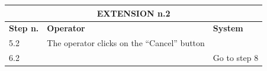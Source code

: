 {{{			\begin{table}[h]
			\begin{tabular}{|p{2cm}|p{6cm}|p{6cm}|}
			\hline
				\multicolumn{3}{|c|}{EXTENSION n.2} \\
			\hline
				\centering \vspace{1mm} \bfseries{Step n.} \vspace{1mm} & \vspace{1mm} \bfseries{Operator} \vspace{1mm} & \vspace{1mm} \bfseries{System} \vspace{1mm}\\
			\hline
				\vspace{1mm} 5.2 \vspace{1mm} &
				\vspace{1mm} The operator clicks on the “Cancel” button\vspace{1mm} & 
				\vspace{1mm} \vspace{1mm} \\
			\hline
				\vspace{1mm} 6.2\vspace{1mm} &
				\vspace{1mm} \vspace{1mm} & 
				\vspace{1mm} Go to step 8\vspace{1mm} \\
			\hline
			\end{tabular}
			\end{table}

			\clearpage

}}}
